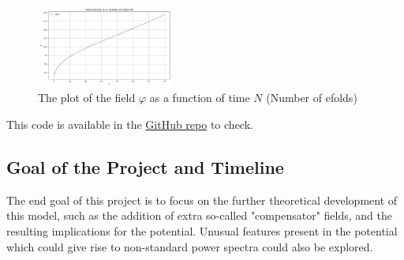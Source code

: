 \documentclass[aps,prd,reprint,preprintnumbers,showpacs,floatfix,nofootinbib,superscript address]{revtex4-2}
\begin{document}
\begin{figure}[h!]
    \centering
    \includegraphics[width=0.4\textwidth]{Field as a function of N.png}
    \caption{The plot of the field $\varphi$ as a function of time $N$ (Number of efolds)}
    \label{Field as function of efolds}
\end{figure}

This code is available in the \href{https://github.com/PrabhodaCS/Part-III-Inflation-Project}{GitHub repo} to check.

\newpage

\subsection{Goal of the Project and Timeline}

The end goal of this project is to focus on the further theoretical development of this model, such as the addition of extra so-called "compensator" fields, and the resulting implications for the potential. Unusual features present in the potential which could give rise to non-standard power spectra could also be explored. 
\end{document}

